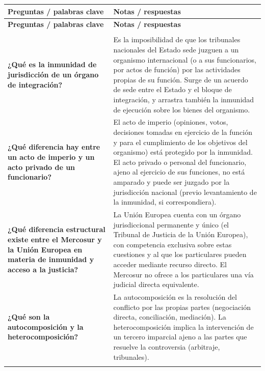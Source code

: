 \documentclass[12pt,oneside]{book}
\begin{document}
\begin{longtable}{
    >{\raggedright\arraybackslash}p{}
    >{\raggedright\arraybackslash}X
}
\toprule
\textbf{Preguntas / palabras clave} & \textbf{Notas / respuestas} \\
\midrule
\endfirsthead

\toprule
\textbf{Preguntas / palabras clave} & \textbf{Notas / respuestas} \\
\midrule
\endhead

\midrule
\multicolumn{2}{r}{\textit{Continúa en la página siguiente}} \\
\endfoot

\bottomrule
\endlastfoot

\textbf{¿Qué es la inmunidad de jurisdicción de un órgano de integración?} &
Es la imposibilidad de que los tribunales nacionales del Estado sede juzguen a un organismo internacional (o a sus funcionarios, por actos de función) por las actividades propias de su función. Surge de un acuerdo de sede entre el Estado y el bloque de integración, y arrastra también la inmunidad de ejecución sobre los bienes del organismo. \\
\addlinespace

\textbf{¿Qué diferencia hay entre un acto de imperio y un acto privado de un funcionario?} &
El acto de imperio (opiniones, votos, decisiones tomadas en ejercicio de la función y para el cumplimiento de los objetivos del organismo) está protegido por la inmunidad. El acto privado o personal del funcionario, ajeno al ejercicio de sus funciones, no está amparado y puede ser juzgado por la jurisdicción nacional (previo levantamiento de la inmunidad, si correspondiera). \\
\addlinespace

\textbf{¿Qué diferencia estructural existe entre el Mercosur y la Unión Europea en materia de inmunidad y acceso a la justicia?} &
La Unión Europea cuenta con un órgano jurisdiccional permanente y único (el Tribunal de Justicia de la Unión Europea), con competencia exclusiva sobre estas cuestiones y al que los particulares pueden acceder mediante recurso directo. El Mercosur no ofrece a los particulares una vía judicial directa equivalente. \\
\addlinespace

\textbf{¿Qué son la autocomposición y la heterocomposición?} &
La autocomposición es la resolución del conflicto por las propias partes (negociación directa, conciliación, mediación). La heterocomposición implica la intervención de un tercero imparcial ajeno a las partes que resuelve la controversia (arbitraje, tribunales). \\
\addlinespace


\end{longtable}
\end{document}
